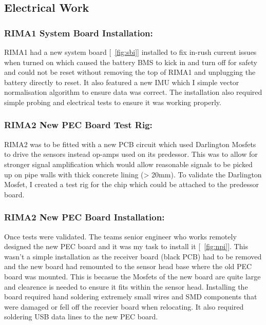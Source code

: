 \subsection{Electrical Work}

\subsubsection{RIMA1 System Board Installation:}
RIMA1 had a new system board [~\ref{fig:sbi}] installed to fix in-rush current issues when turned on which caused the battery BMS to kick in and turn off for safety and could not be reset without removing the top of RIMA1 and 
unplugging the battery directly to reset. It also featured a new IMU which I simple vector normalisation algorithm to ensure data was correct. The installation also required simple probing and electrical tests
to ensure it was working properly. 


\subsubsection{RIMA2 New PEC Board Test Rig:}
RIMA2 was to be fitted with a new PCB circuit which used Darlington Mosfets to drive the sensors instead op-amps used on its predessor. This was to allow for stronger signal amplification which would allow reasonable signals to 
be picked up on pipe walls with thick concrete lining (> 20mm). To validate the Darlington Mosfet, I created a test rig for the chip which could be attached to the predessor board.



\newpage
\subsubsection{RIMA2 New PEC Board Installation:}
Once tests were validated. The teams senior engineer who works remotely designed the new PEC board and it was my task to install it [~\ref{fig:npi}]. This wasn't a simple installation as the receiver board (black PCB) had to be removed and the new board had 
remounted to the sensor head base where the old PEC board was mounted. This is becasue the Mosfets of the new board are quite large and clearence is needed to ensure it fits within the sensor head. Installing the board required 
hand soldering extremely small wires and SMD components that were damaged or fell off the recevier board when relocating. It also required soldering USB data lines to the new PEC board.

